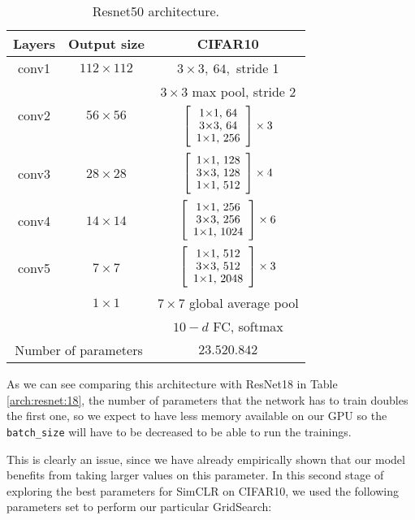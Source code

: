 \begin{table}[H]
    \centering
    \begin{tabular}{|c|c|c|}
    \hline
    Layers                 & Output size                    & CIFAR10                         \\ \hline
    conv1                  & $112\times112$                 & $3\times3, \ 64,$ stride 1      \\ \hline
    \multirow{2}{*}{conv2} & \multirow{2}{*}{$56\times 56$} & $3\times3$ max pool, stride 2   \\ \cline{3-3} 
                           &                                & $\blockb{256}{64}{3}$           \\ \hline
    conv3                  & $28 \times 28$                 & $\blockb{512}{128}{4}$          \\ \hline
    conv4                  & $14 \times 14$                 & $\blockb{1024}{256}{6}$         \\ \hline
    conv5                  & $7 \times 7$                   & $\blockb{2048}{512}{3}$         \\ \hline
    \multirow{2}{*}{}      & $1\times 1$                    & $7\times 7$ global average pool \\ \cline{2-3} 
                           &                                & $10-d$ FC, softmax              \\ \hline
    \multicolumn{2}{|c|}{Number of parameters}              & $23.520.842$                    \\ \hline
    \end{tabular}
    \caption{Resnet50 architecture.}
    \label{table:resnet:50}
\end{table}

    As we can see comparing this architecture with ResNet18 in Table \ref{arch:resnet:18}, the number of parameters that the network has to train doubles the first one, so we expect to have less memory available on our GPU so the \lstinline{batch_size} will have to be decreased to be able to run the trainings. 
    
    This is clearly an issue, since we have already empirically shown  that our model benefits from taking larger values on this parameter. In this second stage of exploring the best parameters for SimCLR on CIFAR10, we used the following parameters set to perform our particular GridSearch:
    
